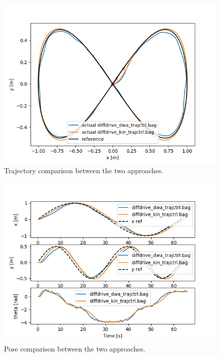 \documentclass[11pt,a4paper]{article}
\begin{document}
\begin{figure}[H]
    \centering
    \includegraphics[scale=0.4]{comparison/Trajectory.png}
    \caption{Trajectory comparison between the two approaches.}
\end{figure}

\begin{figure}[H]
    \centering
    \includegraphics[scale=0.4]{comparison/Pose.png}
    \caption{Pose comparison between the two approaches.}
\end{figure}
\end{document}
